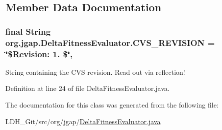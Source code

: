 \subsection{Member Data Documentation}
\hypertarget{classorg_1_1jgap_1_1_delta_fitness_evaluator_a4a930595e0314fd128afb292a5682094}{
\subsubsection[{C\-V\-S\-\_\-\-R\-E\-V\-I\-S\-I\-O\-N}]{\setlength{\rightskip}{0pt plus 5cm}final String org.\-jgap.\-Delta\-Fitness\-Evaluator.\-C\-V\-S\-\_\-\-R\-E\-V\-I\-S\-I\-O\-N = \char`\"{}\$Revision\-: 1. \$\char`\"{}\hspace{0.3cm}{\ttfamily [static]}, {\ttfamily [private]}}}\label{classorg_1_1jgap_1_1_delta_fitness_evaluator_a4a930595e0314fd128afb292a5682094}
String containing the C\-V\-S revision. Read out via reflection! 

Definition at line 24 of file Delta\-Fitness\-Evaluator.\-java.



The documentation for this class was generated from the following file\-:\begin{DoxyCompactItemize}
\item 
L\-D\-H\-\_\-\-Git/src/org/jgap/\hyperlink{_delta_fitness_evaluator_8java}{Delta\-Fitness\-Evaluator.\-java}\end{DoxyCompactItemize}
